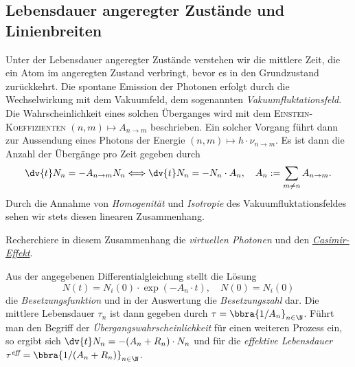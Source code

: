 \documentclass{subfiles}
\begin{document}
    

    \subsection{Lebensdauer angeregter Zustände und Linienbreiten}
        Unter der Lebensdauer angeregter Zustände verstehen wir die mittlere Zeit, die ein Atom im angeregten Zustand verbringt, bevor es in den Grundzustand zurückkehrt. Die spontane Emission der Photonen erfolgt durch die Wechselwirkung mit dem Vakuumfeld, dem sogenannten \emph{Vakuumfluktationsfeld}. Die Wahrscheinlichkeit eines solchen Überganges wird mit dem \textsc{Einstein-Koeffizienten} $(n,m)\mapsto A_{n\to m}$ beschrieben. Ein solcher Vorgang führt dann zur Aussendung eines Photons der Energie $(n,m)\mapsto h\cdot\nu_{n\to m}$. Es ist dann die Anzahl der Übergänge pro Zeit gegeben durch 
        \[
            \dv{t}N_n = -A_{n\to m}N_n\Longleftrightarrow \dv{t}N_n = -N_n\cdot A_n, \quad A_n:=\sum_{m\neq n}A_{n\to m}.
        \]
        Durch die Annahme von \emph{Homogenität} und \emph{Isotropie} des Vakuumfluktationsfeldes sehen wir stets diesen linearen Zusammenhang. 
        \begin{Aufgabe}
            \nr{} Recherchiere in diesem Zusammenhang die \emph{virtuellen Photonen} und den \href{https://de.wikipedia.org/wiki/Casimir-Effekt}{\emph{Casimir-Effekt}}.
        \end{Aufgabe}
        Aus der angegebenen Differentialgleichung stellt die Lösung
        \[
            N(t) = N_i(0)\cdot \exp(-A_n\cdot t),\quad N(0) = N_i(0)
        \]
        die \emph{Besetzungsfunktion} und in der Auswertung die \emph{Besetzungszahl} dar. Die mittlere Lebensdauer $\tau_n$ ist dann gegeben durch $\tau = \bbra{1/A_n}_{n\in\N}$. Führt man den Begriff der \emph{Übergangswahrscheinlichkeit} für einen weiteren Prozess ein, so ergibt sich $\dv{t}N_n = -(A_n + R_n)\cdot N_n$ und für die \emph{effektive Lebensdauer} $\tau^\textit{eff} = \bbra{1/(A_n + R_n)}_{n\in\N}$. 
\end{document}
